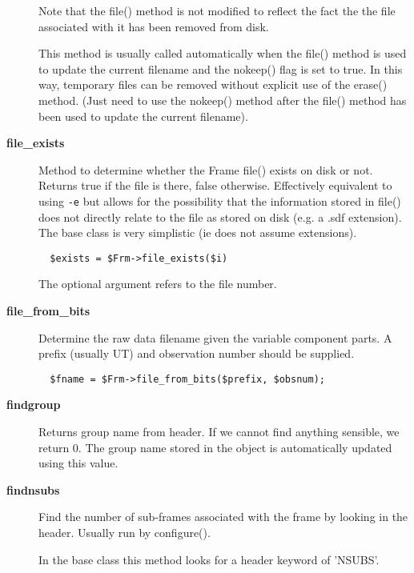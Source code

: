 \begin{description}
Note that the file() method is not modified to reflect the
fact the the file associated with it has been removed from disk.



This method is usually called automatically when the file()
method is used to update the current filename and the nokeep()
flag is set to true. In this way, temporary files can be removed
without explicit use of the erase() method. (Just need to
use the nokeep() method after the file() method has been used
to update the current filename).


\item[{\textbf{file\_exists}}] \mbox{}

Method to determine whether the Frame file() exists on disk or not.
Returns true if the file is there, false otherwise. Effectively
equivalent to using \texttt{-e} but allows for the possibility that the
information stored in file() does not directly relate to the
file as stored on disk (e.g. a .sdf extension). The base class is
very simplistic (ie does not assume extensions).

\begin{verbatim}
  $exists = $Frm->file_exists($i)
\end{verbatim}


The optional argument refers to the file number.


\item[{\textbf{file\_from\_bits}}] \mbox{}

Determine the raw data filename given the variable component
parts. A prefix (usually UT) and observation number should
be supplied.

\begin{verbatim}
  $fname = $Frm->file_from_bits($prefix, $obsnum);
\end{verbatim}

\item[{\textbf{findgroup}}] \mbox{}

Returns group name from header.  If we cannot find anything sensible,
we return 0.  The group name stored in the object is automatically
updated using this value.


\item[{\textbf{findnsubs}}] \mbox{}

Find the number of sub-frames associated with the frame by looking in
the header. Usually run by configure().



In the base class this method looks for a header keyword of 'NSUBS'.


\end{description}
